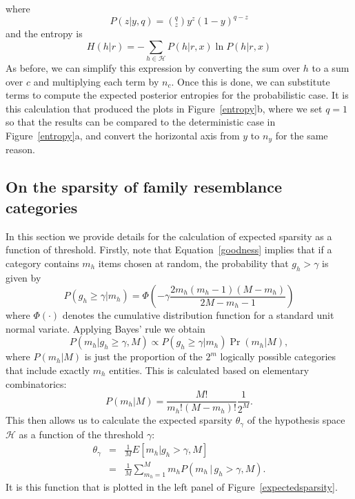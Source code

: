 \documentclass{apa}
\newcommand{\given}{\, | \,}
\newcommand{\ruleset}{\mathcal{H}}
\newcommand{\p}{P}
\begin{document}
where
\begin{equation}
 P(z|y,q) = (^q_z) y^z (1-y)^{q-z}
\end{equation}
and the entropy is
\begin{equation}
H(h|r) = - \sum_{h \in \mathcal{H}} P(h|r,x) \ln P(h|r,x)
\end{equation}
As before, we can simplify this expression by converting the sum over $h$ to a sum over $c$ and multiplying each term by $n_c$. Once this is done, we can substitute terms to compute the expected posterior entropies for the probabilistic case. It is this calculation that produced the plots in Figure~\ref{entropy}b, where we set $q=1$ so that the results can be compared to the deterministic case in Figure~\ref{entropy}a, and convert the horizontal axis from $y$ to $n_y$ for the same reason.


\subsection{On the sparsity of family resemblance categories}

In this section we provide details for the calculation of expected sparsity as a function of threshold.  Firstly, note that Equation~\ref{goodness} implies that if a category contains $m_h$ items chosen at random, the probability that $g_h>\gamma$ is given by
\begin{equation}
\p(g_h \geq \gamma | m_h) = \Phi \left( -\gamma\frac{2m_h(m_h-1)(M-m_h)}{2M -m_h -1} \right)
\end{equation}
\noindent
where $\Phi(\cdot)$ denotes the cumulative distribution function for a standard unit normal variate. Applying Bayes' rule we obtain
\begin{equation}
\p(m_h | g_h \geq \gamma, M) \propto \p(g_h \geq \gamma | m_h) \Pr(m_h | M),
\end{equation}
\noindent
where $\p(m_h | M)$ is just the proportion of the $2^m$ logically possible categories that include exactly $m_h$ entities. This is calculated based on elementary combinatorics:
\begin{equation}
\p(m_h | M) = \frac{M!}{m_h!(M-m_h)!} \frac{1}{2^M}.
\end{equation}
This then allows us to calculate the expected sparsity $\theta_\gamma$ of the hypothesis space $\ruleset$ as a function of the threshold $\gamma$:
\begin{eqnarray}
\theta_\gamma
&=&\frac{1}{M} E[m_h | g_h > \gamma, M] \\
&=& \frac{1}{M} \sum_{m_h=1}^{M} m_h \p(m_h \given g_h > \gamma, M).
\end{eqnarray}
It is this function that is plotted in the left panel of Figure~\ref{expectedsparsity}.
\end{document}
